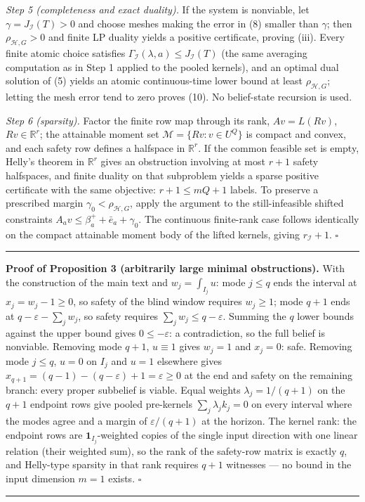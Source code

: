 \documentclass[10pt,article]{article}
\newcommand{\rulebar}{\begin{center}\rule{0.5\linewidth}{0.5pt}\end{center}}
\begin{document}
\emph{Step 5 (completeness and exact duality).} If the system is nonviable,
let \(\gamma = J_{\mathcal I}(T) > 0\) and choose meshes making the error in
(8) smaller than \(\gamma\); then \(\rho_{\mathcal H,G} > 0\) and finite LP
duality yields a positive certificate, proving (iii). Every finite atomic
choice satisfies \(\Gamma_{\mathcal I}(\lambda, a) \le J_{\mathcal I}(T)\)
(the same averaging computation as in Step 1 applied to the pooled kernels),
and an optimal dual solution of (5) yields an atomic continuous-time lower
bound at least \(\rho_{\mathcal H,G}\); letting the mesh error tend to zero
proves (10). No belief-state recursion is used.

\emph{Step 6 (sparsity).} Factor the finite row map through its rank,
\(A v = L(Rv)\), \(Rv \in \mathbb R^{r}\); the attainable moment set
\(\mathcal M = \{Rv : v \in U^{Q}\}\) is compact and convex, and each safety
row defines a halfspace in \(\mathbb R^{r}\). If the common feasible set is
empty, Helly's theorem in \(\mathbb R^{r}\) gives an obstruction involving at
most \(r + 1\) safety halfspaces, and finite duality on that subproblem
yields a sparse positive certificate with the same objective: \(r + 1 \le mQ
+ 1\) labels. To preserve a prescribed margin \(\gamma_0 < \rho_{\mathcal
H,G}\), apply the argument to the still-infeasible shifted constraints \(A_a
v \le \beta_a^{+} + \bar e_a + \gamma_0\). The continuous finite-rank case
follows identically on the compact attainable moment body of the lifted
kernels, giving \(r_{\mathcal I} + 1\). \hfill\(\square\)
\rulebar

\textbf{Proof of Proposition 3 (arbitrarily large minimal obstructions).}
With the construction of the main text and \(w_j = \int_{I_j} u\): mode
\(j \le q\) ends the interval at \(x_j = w_j - 1 \ge 0\), so safety of the
blind window requires \(w_j \ge 1\); mode \(q+1\) ends at \(q - \varepsilon -
\sum_j w_j\), so safety requires \(\sum_j w_j \le q - \varepsilon\). Summing
the \(q\) lower bounds against the upper bound gives \(0 \le -\varepsilon\):
a contradiction, so the full belief is nonviable. Removing mode \(q+1\),
\(u \equiv 1\) gives \(w_j = 1\) and \(x_j = 0\): safe. Removing mode \(j \le
q\), \(u = 0\) on \(I_j\) and \(u = 1\) elsewhere gives \(x_{q+1} =
(q-1) - (q - \varepsilon) + 1 = \varepsilon \ge 0\) at the end and safety on
the remaining branch: every proper subbelief is viable. Equal weights
\(\lambda_j = 1/(q{+}1)\) on the \(q+1\) endpoint rows give pooled pre-kernels
\(\sum_j \lambda_j k_j = 0\) on every interval where the modes agree and a
margin of \(\varepsilon/(q{+}1)\) at the horizon. The kernel rank: the
endpoint rows are \(\mathbf 1_{I_j}\)-weighted copies of the single input
direction with one linear relation (their weighted sum), so the rank of the
safety-row matrix is exactly \(q\), and Helly-type sparsity in that rank
requires \(q + 1\) witnesses --- no bound in the input dimension \(m = 1\)
exists. \hfill\(\square\)
\rulebar
\end{document}
